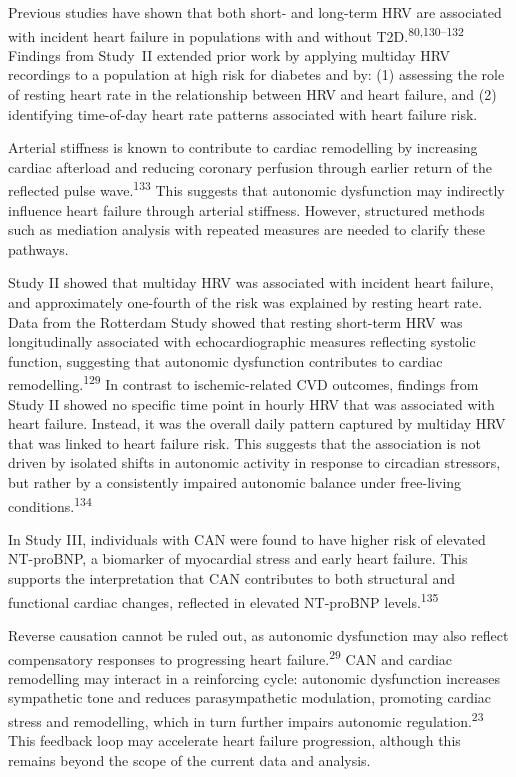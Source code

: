 \documentclass[
  a4paper,
  headsepline=true,
  open=left]{scrbook}
\begin{document}
Previous studies have shown that both short- and long-term HRV are
associated with incident heart failure in populations with and without
T2D.\textsuperscript{80,130--132} Findings from Study \,II extended
prior work by applying multiday HRV recordings to a population at high
risk for diabetes and by: (1) assessing the role of resting heart rate
in the relationship between HRV and heart failure, and (2) identifying
time-of-day heart rate patterns associated with heart failure risk.

Arterial stiffness is known to contribute to cardiac remodelling by
increasing cardiac afterload and reducing coronary perfusion through
earlier return of the reflected pulse wave.\textsuperscript{133} This
suggests that autonomic dysfunction may indirectly influence heart
failure through arterial stiffness. However, structured methods such as
mediation analysis with repeated measures are needed to clarify these
pathways.

Study II showed that multiday HRV was associated with incident heart
failure, and approximately one-fourth of the risk was explained by
resting heart rate. Data from the Rotterdam Study showed that resting
short-term HRV was longitudinally associated with echocardiographic
measures reflecting systolic function, suggesting that autonomic
dysfunction contributes to cardiac remodelling.\textsuperscript{129} In
contrast to ischemic-related CVD outcomes, findings from Study II showed
no specific time point in hourly HRV that was associated with heart
failure. Instead, it was the overall daily pattern captured by multiday
HRV that was linked to heart failure risk. This suggests that the
association is not driven by isolated shifts in autonomic activity in
response to circadian stressors, but rather by a consistently impaired
autonomic balance under free-living conditions.\textsuperscript{134}

In Study III, individuals with CAN were found to have higher risk of
elevated NT-proBNP, a biomarker of myocardial stress and early heart
failure. This supports the interpretation that CAN contributes to both
structural and functional cardiac changes, reflected in elevated
NT-proBNP levels.\textsuperscript{135}

Reverse causation cannot be ruled out, as autonomic dysfunction may also
reflect compensatory responses to progressing heart
failure.\textsuperscript{29} CAN and cardiac remodelling may interact in
a reinforcing cycle: autonomic dysfunction increases sympathetic tone
and reduces parasympathetic modulation, promoting cardiac stress and
remodelling, which in turn further impairs autonomic
regulation.\textsuperscript{23} This feedback loop may accelerate heart
failure progression, although this remains beyond the scope of the
current data and analysis.
\end{document}
